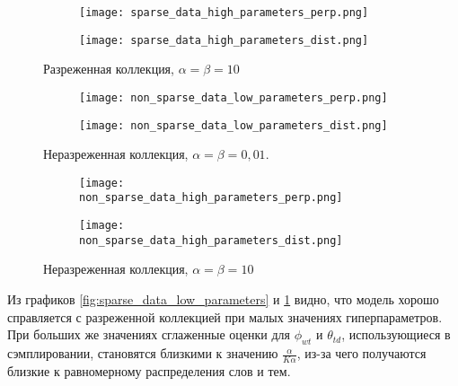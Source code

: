 \documentclass[12pt]{article}
\begin{document}
\begin{figure}[hbtp]
  \centering
  \begin{subfigure}[b]{0.49\textwidth}
    \centering
    \texttt{[image: sparse\_data\_high\_parameters\_perp.png]}
  \end{subfigure}
  \begin{subfigure}[b]{0.49\textwidth}
    \centering
    \texttt{[image: sparse\_data\_high\_parameters\_dist.png]}
  \end{subfigure}
  \caption{Разреженная коллекция, $ \alpha = \beta = 10 $}
  \label{fig:sparse_data_high_parameters}
\end{figure}

\begin{figure}[hbtp]
  \centering
  \begin{subfigure}[b]{0.49\textwidth}
    \centering
    \texttt{[image: non\_sparse\_data\_low\_parameters\_perp.png]}
  \end{subfigure}
  \begin{subfigure}[b]{0.49\textwidth}
    \centering
    \texttt{[image: non\_sparse\_data\_low\_parameters\_dist.png]}
  \end{subfigure}
  \caption{Неразреженная коллекция, $ \alpha = \beta = 0,01 $.}
  \label{fig:non_sparse_data_low_parameters}
\end{figure}

\begin{figure}[hbtp]
  \centering
  \begin{subfigure}[b]{0.49\textwidth}
    \centering
    \texttt{[image: non\_sparse\_data\_high\_parameters\_perp.png]}
  \end{subfigure}
  \begin{subfigure}[b]{0.49\textwidth}
    \centering
    \texttt{[image: non\_sparse\_data\_high\_parameters\_dist.png]}
  \end{subfigure}
  \caption{Неразреженная коллекция, $ \alpha = \beta = 10 $}
  \label{fig:non_sparse_data_high_parameters}
\end{figure}

Из графиков \ref{fig:sparse_data_low_parameters} и \ref{fig:sparse_data_high_parameters} видно, что модель хорошо справляется с разреженной коллекцией при малых значениях гиперпараметров.
При больших же значениях сглаженные оценки для $ \phi_{wt} $ и $ \theta_{td} $, использующиеся в сэмплировании, становятся близкими к значению $ \frac \alpha {K \alpha} $, из-за чего получаются близкие к равномерному распределения слов и тем.
\end{document}

